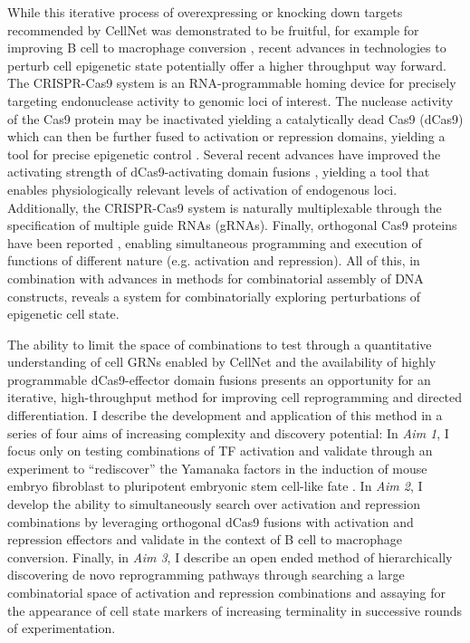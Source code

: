 \documentclass[10pt]{article}
\begin{document}
While this iterative process of overexpressing or knocking down targets recommended by CellNet was demonstrated to be fruitful, for example for improving B cell to macrophage conversion \cite{morris2014dissecting}, recent advances in technologies to perturb cell epigenetic state potentially offer a higher throughput way forward. The CRISPR-Cas9 system is an RNA-programmable homing device for precisely targeting endonuclease activity to genomic loci of interest. The nuclease activity of the Cas9 protein may be inactivated yielding a catalytically dead Cas9 (dCas9) which can then be further fused to activation or repression domains, yielding a tool for precise epigenetic control \cite{qi2013repurposing}. Several recent advances have improved the activating strength of dCas9-activating domain fusions \cite{konermann2014genome, chavez2015VPR}, yielding a tool that enables physiologically relevant levels of activation of endogenous loci. Additionally, the CRISPR-Cas9 system is naturally multiplexable through the specification of multiple guide RNAs (gRNAs). Finally, orthogonal Cas9 proteins have been reported \cite{esvelt2013orthogonal}, enabling simultaneous programming and execution of functions of different nature (e.g. activation and repression). All of this, in combination with advances in methods for combinatorial assembly of DNA constructs, reveals a system for combinatorially exploring perturbations of epigenetic cell state.

The ability to limit the space of combinations to test through a quantitative understanding of cell GRNs enabled by CellNet and the availability of highly programmable dCas9-effector domain fusions presents an opportunity for an iterative, high-throughput method for improving cell reprogramming and directed differentiation. I describe the development and application of this method in a series of four aims of increasing complexity and discovery potential: In \textit{Aim 1}, I focus only on testing combinations of TF activation and validate through an experiment to ``rediscover'' the Yamanaka factors in the induction of mouse embryo fibroblast to pluripotent embryonic stem cell-like fate \cite{takahashi2006induction}. In \textit{Aim 2}, I develop the ability to simultaneously search over activation and repression combinations by leveraging orthogonal dCas9 \cite{esvelt2013orthogonal} fusions with activation and repression effectors and validate in the context of B cell to macrophage conversion. Finally, in \textit{Aim 3}, I describe an open ended method of hierarchically discovering de novo reprogramming pathways through searching a large combinatorial space of activation and repression combinations and assaying for the appearance of cell state markers of increasing terminality in successive rounds of experimentation.
\end{document}
